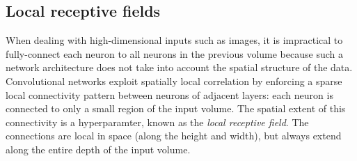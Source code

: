 \documentclass[../main.tex]{subfiles}
\begin{document}
\subsection{Local receptive fields}
When dealing with high-dimensional inputs such as images, it is impractical to
fully-connect each neuron to all neurons in the previous volume because such a
network architecture does not take into account the spatial structure of the
data.
%
Convolutional networks exploit spatially local correlation by enforcing a
sparse local connectivity pattern between neurons of adjacent layers: each
neuron is connected to only a small region of the input volume.
%
The spatial extent of this connectivity is a hyperparamter, known as the
\emph{local receptive field}.
%
The connections are local in space (along the height and width), but always
extend along the entire depth of the input volume.
\end{document}
